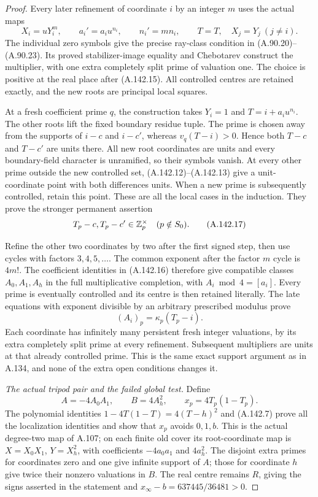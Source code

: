 \begin{proof}
Every later refinement of coordinate \(i\) by an integer \(m\)
uses the actual maps
\[
   X_i=uY_i^m,\qquad a_i'=a_i u^{n_i},\qquad n_i'=mn_i,
               \qquad T=T,\quad X_j=Y_j\ (j\ne i).
\tag{A.142.16}
\]
The individual zero symbols give the precise ray-class condition
in (A.90.20)--(A.90.23).  Its proved stabilizer-image equality
and Chebotarev construct the multiplier, with one extra completely
split prime of valuation one.  The choice is positive at the real
place after (A.142.15).  All controlled centres are retained
exactly, and the new roots are principal local squares.

At a fresh coefficient prime \(q\), the construction takes
\(Y_i=1\) and \(T=i+a_i u^{n_i}\).
The other roots lift the fixed boundary residue tuple.
The prime is chosen away from the supports of \(i-c\) and
\(i-c'\), whereas \(v_q(T-i)>0\).  Hence both \(T-c\)
and \(T-c'\) are units there.  All new root coordinates are
units and every boundary-field character is unramified, so their
symbols vanish.  At every other prime outside the new controlled
set, (A.142.12)--(A.142.13) give a unit-coordinate point with
both differences units.  When a new prime is subsequently
controlled, retain this point.  These are all the local cases in
the induction.  They prove the stronger permanent assertion
\[
                   T_p-c, T_p-c'\in\mathbb Z_p^\times
                                      \quad(p\notin S_0).
\tag{A.142.17}
\]

Refine the other two coordinates by two after the first signed
step, then use cycles with factors \(3,4,5,\ldots\).
The common exponent after the factor \(m\) cycle is \(4m!\).
The coefficient identities in (A.142.16) therefore give compatible
classes \(A_0,A_1,A_h\) in the full multiplicative completion,
with \(A_i\bmod4=[a_i]\).
Every prime is eventually controlled and its centre is then
retained literally.  The late equations with exponent divisible
by an arbitrary prescribed modulus prove
\[
                   (A_i)_p=\kappa_p(T_p-i).
\tag{A.142.18}
\]
Each coordinate has infinitely many persistent fresh integer
valuations, by its extra completely split prime at every
refinement.  Subsequent multipliers are units at that already
controlled prime.  This is the same exact support argument as
in A.134, and none of the extra open conditions changes it.

\emph{The actual tripod pair and the failed global test.}
Define
\[
       A=-4A_0A_1,\qquad B=4A_h^2,
                       \qquad x_p=4T_p(1-T_p).
\tag{A.142.19}
\]
The polynomial identities
\(1-4T(1-T)=4(T-h)^2\) and (A.142.7) prove all the
localization identities and show that \(x_p\) avoids
\(0,1,b\).  This is the actual degree-two map of A.107;
on each finite old cover its root-coordinate map is
\(X=X_0X_1\), \(Y=X_h^2\), with coefficients
\(-4a_0a_1\) and \(4a_h^2\).
The disjoint extra primes for coordinates zero and one give
infinite support of \(A\); those for coordinate \(h\) give
twice their nonzero valuations in \(B\).
The real centre remains \(R\), giving the signs asserted in
the statement and
\(x_\infty-b=637445/36481>0\).


\end{proof}
